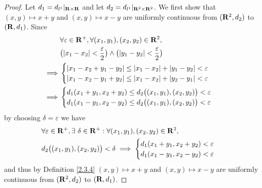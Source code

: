 \begin{proof}
    Let \(d_1 = d_{l^1}|_{\mathbf{R} \times \mathbf{R}}\) and let \(d_2 = d_{l^1}|_{\mathbf{R}^2 \times \mathbf{R}^2}\).
    We first show that \((x, y) \mapsto x + y\) and \((x, y) \mapsto x - y\) are uniformly continuous from \((\mathbf{R}^2, d_2)\) to \((\mathbf{R}, d_1)\).
    Since
    \begin{align*}
                 & \forall \varepsilon \in \R^+, \forall (x_1, y_1), (x_2, y_2) \in \R^2,                                    \\
                 & \big(\abs{x_1 - x_2} < \frac{\varepsilon}{2}\big) \land \big(\abs{y_1 - y_2} < \frac{\varepsilon}{2}\big) \\
        \implies & \begin{cases}
                       \abs{x_1 - x_2 + y_1 - y_2} \leq \abs{x_1 - x_2} + \abs{y_1 - y_2} < \varepsilon \\
                       \abs{x_1 - x_2 - y_1 + y_2} \leq \abs{x_1 - x_2} + \abs{y_2 - y_1} < \varepsilon \\
                   \end{cases}                          \\
        \implies & \begin{cases}
                       d_1(x_1 + y_1, x_2 + y_2) \leq d_2\big((x_1, y_1), (x_2, y_2)\big) < \varepsilon \\
                       d_1(x_1 - y_1, x_2 - y_2) \leq d_2\big((x_1, y_1), (x_2, y_2)\big) < \varepsilon
                   \end{cases}
    \end{align*}
    by choosing \(\delta = \varepsilon\) we have
    \begin{align*}
         & \forall \varepsilon \in \mathbf{R}^+, \exists\ \delta \in \mathbf{R}^+ : \forall (x_1, y_1), (x_2, y_2) \in \mathbf{R}^2, \\
         & d_2\big((x_1, y_1), (x_2, y_2)\big) < \delta \implies \begin{cases}
                                                                     d_1(x_1 + y_1, x_2 + y_2) < \varepsilon \\
                                                                     d_1(x_1 - y_1, x_2 - y_2) < \varepsilon
                                                                 \end{cases}
    \end{align*}
    and thus by Definition \ref{2.3.4} \((x, y) \mapsto x + y\) and \((x, y) \mapsto x - y\) are uniformly continuous from \((\mathbf{R}^2, d_2)\) to \((\mathbf{R}, d_1)\).


\end{proof}
